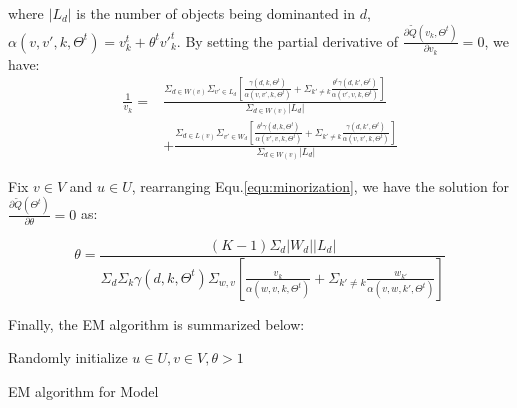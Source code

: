 \documentclass[sigconf]{acmart}
\begin{document}
where $|L_d|$ is the number of objects being dominanted in $d$, $\alpha(v,v',k,\Theta^t)=v_k^t + \theta^t {v'}_k^t$. By setting the partial derivative of $\frac{\partial \tilde{Q}(v_k,\Theta^t)}{\partial v_k}=0$, we have:
\begin{align}\label{equ:v}
\frac{1}{v_k}= &\frac{\Sigma_{d\in W(v)}\Sigma_{v'\in L_d} [\frac{\gamma(d,k,\Theta^t)}{ \alpha(v,v',k,\Theta^t)} +\Sigma_{k'\neq k}\frac{\theta^t\gamma(d,k',\Theta^t)}{\alpha(v',v,k,\Theta^t)}]}{\Sigma_{d\in W(v)}|L_d|}\\\nonumber
 & + \frac{\Sigma_{d\in L(v)}\Sigma_{v'\in W_d} [\frac{\theta^t \gamma(d,k,\Theta^t)}{\alpha(v',v,k,\Theta^t)}+\Sigma_{k'\neq k} \frac{\gamma(d,k',\Theta^t)}{\alpha(v,v',k,\Theta^t)}] }{\Sigma_{d\in W(v)}|L_d|}
\end{align}

Fix $v \in V$ and $u \in U$, rearranging Equ.\ref{equ:minorization}, we have the solution for $\frac{\partial \tilde{Q}(\Theta^t)}{\partial \theta}=0$ as:

\begin{equation}\label{equ:theta}
\theta = \frac{(K-1)\Sigma_d |W_d| |L_d|}{\Sigma_d \Sigma_k \gamma(d,k,\Theta^t)\Sigma_{w,v} [\frac{v_k}{\alpha(w,v,k,\Theta^t)}+\Sigma_{k'\neq k} \frac{w_{k'}}{\alpha(v,w,k',\Theta^t)}]}
\end{equation}

Finally, the EM algorithm is summarized below:

\begin{algorithm}
Randomly initialize $u \in U, v \in V, \theta >1$\;

\;
\caption{EM algorithm for Model}
\label{algo:EM}
\end{algorithm}
\end{document}
